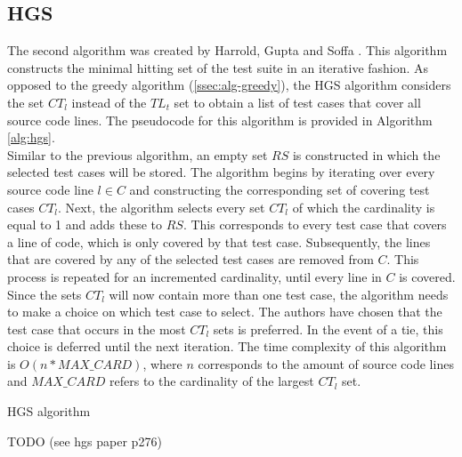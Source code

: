 
\subsection{HGS}
The second algorithm was created by Harrold, Gupta and Soffa \cite{hgs}. This algorithm constructs the minimal hitting set of the test suite in an iterative fashion. As opposed to the greedy algorithm (\autoref{ssec:alg-greedy}), the HGS algorithm considers the set $CT_l$ instead of the $TL_t$ set to obtain a list of test cases that cover all source code lines. The pseudocode for this algorithm is provided in Algorithm \autoref{alg:hgs}.\\

\noindent Similar to the previous algorithm, an empty set $RS$ is constructed in which the selected test cases will be stored. The algorithm begins by iterating over every source code line $l \in C$ and constructing the corresponding set of covering test cases $CT_l$. Next, the algorithm selects every set $CT_l$ of which the cardinality is equal to 1 and adds these to $RS$. This corresponds to every test case that covers a line of code, which is only covered by that test case. Subsequently, the lines that are covered by any of the selected test cases are removed from $C$. This process is repeated for an incremented cardinality, until every line in $C$ is covered. Since the sets $CT_l$ will now contain more than one test case, the algorithm needs to make a choice on which test case to select. The authors have chosen that the test case that occurs in the most $CT_l$ sets is preferred. In the event of a tie, this choice is deferred until the next iteration. The time complexity of this algorithm is $O(n * MAX\_CARD)$, where $n$ corresponds to the amount of source code lines and $MAX\_CARD$ refers to the cardinality of the largest $CT_l$ set.

\begin{algorithm}[h!]
\caption{HGS algorithm}
\label{alg:hgs}
\begin{algorithmic}[1]
	\State TODO (see hgs paper p276)
\end{algorithmic}
\end{algorithm}
